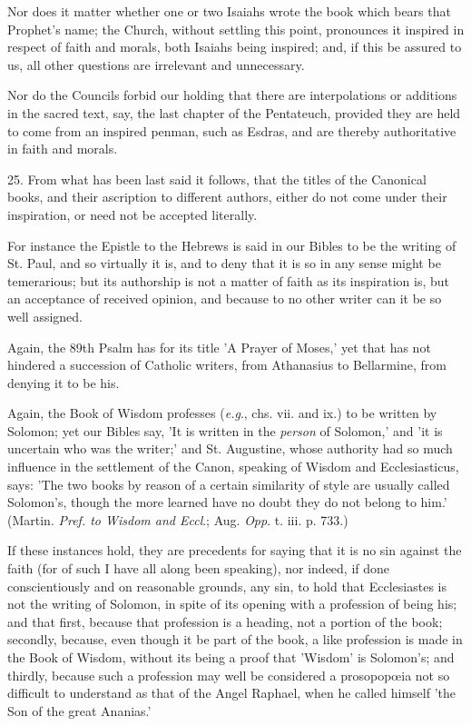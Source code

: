 Nor does it matter whether one or two Isaiahs
wrote the book which bears that Prophet's name; the Church, without
settling this point, pronounces it inspired in respect of faith and
morals, both Isaiahs being inspired; and, if this be assured to us,
all other questions are irrelevant and unnecessary.

Nor do the Councils forbid our holding that there
are interpolations or additions in the sacred text, say, the last
chapter of the Pentateuch, provided they are held to come from an
inspired penman, such as Esdras, and are thereby authoritative in
faith and morals.

25. From what has been last said it follows, that
the titles of the Canonical books, and their ascription to different
authors, either do not come under their inspiration, or need not be
accepted literally.

For instance the Epistle to the Hebrews is said
in our Bibles to be the writing of St. Paul, and so virtually it is,
and to deny that it is so in any sense might be temerarious; but its
authorship is not a matter of faith as its inspiration is, but an
acceptance of received opinion, and because to no other writer can it
be so well assigned.

Again, the 89th Psalm has for its title 'A Prayer
of Moses,' yet that has not hindered a succession of Catholic
writers, from Athanasius to Bellarmine, from denying it to be his.

Again, the Book of Wisdom professes (\emph{e.g}.,
chs. vii. and ix.) to be written by Solomon; yet our Bibles say, 'It
is written in the \emph{person} of Solomon,' and 'it is uncertain who
was the writer;' and St. Augustine, whose authority had so much
influence in the settlement of the Canon, speaking of Wisdom and
Ecclesiasticus, says: 'The two books by reason of a certain similarity
of style are usually called Solomon's, though the more learned have no
doubt they do not belong to him.' (Martin. \emph{Pref. to Wisdom and Eccl}.;
Aug. \emph{Opp}. t. iii. p. 733.)

If these instances hold, they are precedents for
saying that it is no sin against the faith (for of such I have all
along been speaking), nor indeed, if done conscientiously and on
reasonable grounds, any sin, to hold that Ecclesiastes is not the
writing of Solomon, in spite of its opening with a profession of being
his; and that first, because that profession is a heading, not a
portion of the book; secondly, because, even though it be part of the
book, a like profession is made in the Book of Wisdom, without its
being a proof that 'Wisdom' is Solomon's; and thirdly, because such a
profession may well be considered a prosopopœia not so difficult to
understand as that of the Angel Raphael, when he called himself 'the
Son of the great Ananias.'

